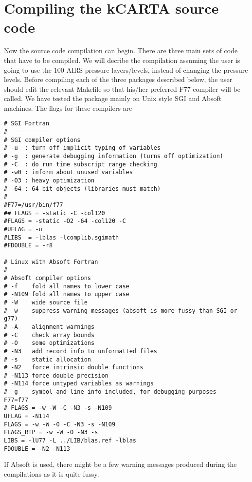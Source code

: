 \documentclass[11pt]{article}
\newcommand{\kc}{\textsf{kCARTA}\xspace}
\begin{document}
\section{Compiling the \kc source code}
Now the source code compilation can begin. There are three main sets of code
that have to be compiled. We will decribe the compilation assuming the user 
is going to use the 100 AIRS pressure layers/levels, instead of changing the 
pressure levels. Before compiling each of the three packages described below, 
the user should edit the relevant Makefile so that his/her preferred F77 
compiler will be called. We have tested the package mainly on Unix style 
SGI and Absoft machines. The flags for these compilers are
\begin{verbatim}
# SGI Fortran
# ------------
# SGI compiler options
# -u  : turn off implicit typing of variables
# -g  : generate debugging information (turns off optimization)
# -C  : do run time subscript range checking
# -w0 : inform about unused variables 
# -O3 : heavy optimization
# -64 : 64-bit objects (libraries must match)
#
#F77=/usr/bin/f77
## FLAGS = -static -C -col120
#FLAGS = -static -O2 -64 -col120 -C
#UFLAG = -u
#LIBS  = -lblas -lcomplib.sgimath
#FDOUBLE = -r8

# Linux with Absoft Fortran
# --------------------------
# Absoft compiler options
# -f    fold all names to lower case
# -N109 fold all names to upper case
# -W    wide source file
# -w    suppress warning messages (absoft is more fussy than SGI or g77)
# -A    alignment warnings
# -C    check array bounds
# -O    some optimizations
# -N3   add record info to unformatted files
# -s    static allocation
# -N2   force intrinsic double functions
# -N113 force double precision 
# -N114 force untyped variables as warnings
# -g    symbol and line info included, for debugging purposes
F77=f77
# FLAGS = -w -W -C -N3 -s -N109
UFLAG = -N114
FLAGS = -w -W -O -C -N3 -s -N109
FLAGS_RTP = -w -W -O -N3 -s
LIBS = -lU77 -L ../LIB/blas.ref -lblas 
FDOUBLE = -N2 -N113
\end{verbatim}

If Absoft is used, there might be a few warning messages produced during the 
compilations as it is quite fussy.
\end{document}
